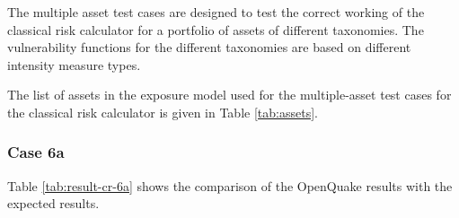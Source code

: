 The multiple asset test cases are designed to test the correct working of the classical risk calculator for a portfolio of assets of different taxonomies. The vulnerability functions for the different taxonomies are based on different intensity measure types.

The list of assets in the exposure model used for the multiple-asset test cases for the classical risk calculator is given in Table \ref{tab:assets}.

\subsubsection{Case 6a}




Table \ref{tab:result-cr-6a} shows the comparison of the OpenQuake results with the expected results.